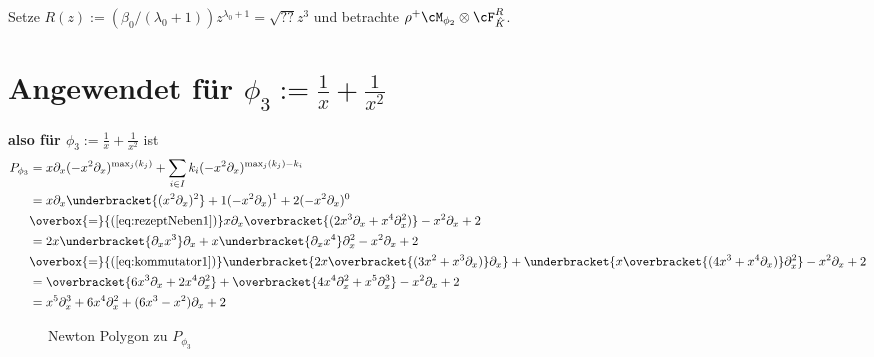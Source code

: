 Setze $R(z):=(\beta_0/(\lambda_0+1))z^{\lambda_0+1}=\sqrt{??}z^3$ und betrachte
$\rho^+\cM_{\phi_2}\otimes\cF_{\hat K}^R$.

\section{Angewendet für $\phi_3:=\frac{1}{x}+\frac{1}{x^2}$}
\textbf{also für $\phi_3:=\frac{1}{x}+\frac{1}{x^2}$} ist
\begin{align*}
P_{\phi_3} &=x\partial_x(-x^2\partial_x)^{\max_j(k_j)}
             +\sum_{i\in I} k_i(-x^2\partial_x)^{\max_j(k_j)-k_i}\\
           &=x\partial_x\underbracket{(x^2\partial_x)^{2}}
             +1(-x^2\partial_x)^{1}+2(-x^2\partial_x)^{0}\\
           &\overbox{=}{(\ref{eq:rezeptNeben1})}
             x\partial_x \overbracket{(2x^3\partial_x+x^4\partial_x^2)}
             -x^2\partial_x+2\\
           &=2x\underbracket{\partial_xx^3}\partial_x
             +x\underbracket{\partial_xx^4}\partial_x^2
             -x^2\partial_x+2\\
           &\overbox{=}{(\ref{eq:kommutator1})}
             \underbracket{2x\overbracket{(3x^2+x^3\partial_x)}\partial_x}
             +\underbracket{x\overbracket{(4x^3+x^4\partial_x)}\partial_x^2}
             -x^2\partial_x+2\\
           &=\overbracket{6x^3\partial_x+2x^4\partial_x^2}
             +\overbracket{4x^4\partial_x^2+x^5\partial_x^3}
             -x^2\partial_x+2\\
           &= x^5\partial_x^3+6x^4\partial_x^2+(6x^3-x^2)\partial_x+2
\end{align*}
\begin{figure}[H]
\caption{Newton Polygon zu $P_{\phi_3}$}
\begin{center}
\end{center}
\end{figure}

